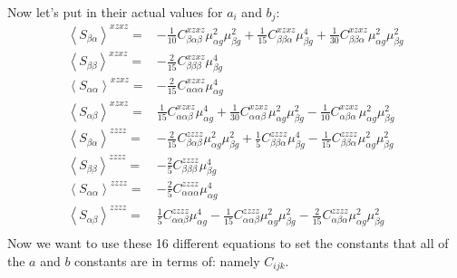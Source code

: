 Now let's put in their actual values for $a_i$ and $b_j$:
\begin{align*}
	\left \langle S_{\beta \alpha} \right \rangle^{xzxz} =&    -\frac{1}{10} C_{\beta \alpha \beta}^{xzxz} \mu_{\alpha g}^2 \mu_{\beta g}^2 +  \frac{1}{15} C_{\beta \beta \alpha}^{xzxz} \mu_{\beta g}^4 + \frac{1}{30} C_{\beta \beta \alpha}^{xzxz} \mu_{\alpha g}^2 \mu_{\beta g}^2 \\
	\left \langle S_{\beta \beta} \right \rangle^{xzxz} =&   -\frac{2}{15} C_{\beta \beta \beta}^{xzxz} \mu_{\beta g}^4\\
	\left \langle S_{\alpha \alpha} \right \rangle^{xzxz} =& - \frac{2}{15} C_{\alpha \alpha \alpha}^{xzxz} \mu_{\alpha g}^4  \\
	\left \langle S_{\alpha \beta} \right \rangle^{xzxz} =&   \frac{1}{15} C_{\alpha \alpha \beta}^{xzxz} \mu_{\alpha g}^4 + \frac{1}{30} C_{\alpha \alpha \beta}^{xzxz} \mu_{\alpha g}^2 \mu_{\beta g}^2 -\frac{1}{10} C_{\alpha \beta \alpha}^{xzxz} \mu_{\alpha g}^2 \mu_{\beta g}^2  \\
   \left \langle S_{\beta \alpha} \right \rangle^{zzzz} =&    -\frac{2}{15} C_{\beta \alpha \beta}^{zzzz} \mu_{\alpha g}^2 \mu_{\beta g}^2 +  \frac{1}{5} C_{\beta \beta \alpha}^{zzzz} \mu_{\beta g}^4 - \frac{1}{15} C_{\beta \beta \alpha}^{zzzz} \mu_{\alpha g}^2 \mu_{\beta g}^2 \\
   \left \langle S_{\beta \beta} \right \rangle^{zzzz} =&   -\frac{2}{5} C_{\beta \beta \beta}^{zzzz} \mu_{\beta g}^4\\
   \left \langle S_{\alpha \alpha} \right \rangle^{zzzz} =& - \frac{2}{5} C_{\alpha \alpha \alpha}^{zzzz} \mu_{\alpha g}^4  \\
   \left \langle S_{\alpha \beta} \right \rangle^{zzzz} =&   \frac{1}{5} C_{\alpha \alpha \beta}^{zzzz} \mu_{\alpha g}^4 - \frac{1}{15} C_{\alpha \alpha \beta}^{zzzz} \mu_{\alpha g}^2 \mu_{\beta g}^2 -\frac{2}{15} C_{\alpha \beta \alpha}^{zzzz} \mu_{\alpha g}^2 \mu_{\beta g}^2  \\
\end{align*}
Now we want to use these 16 different equations to set the constants that all of the $a$ and $b$ constants are in terms of: namely $C_{ijk}$.

